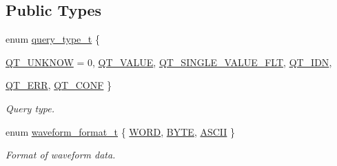\subsection*{Public Types}
\begin{DoxyCompactItemize}
\item 
enum \hyperlink{classmdt_frame_codec_scpi_a2dbce7589140e915f3e253c3523b3b9a}{query\_\-type\_\-t} \{ \par
\hyperlink{classmdt_frame_codec_scpi_a2dbce7589140e915f3e253c3523b3b9aa80aaf6e25ad52710c5f61c6d734a0897}{QT\_\-UNKNOW} =  0, 
\hyperlink{classmdt_frame_codec_scpi_a2dbce7589140e915f3e253c3523b3b9aae429676cb0129c2cb9179baf00d7e082}{QT\_\-VALUE}, 
\hyperlink{classmdt_frame_codec_scpi_a2dbce7589140e915f3e253c3523b3b9aa0f4f3edfd4d8b84dcbbff566de1278df}{QT\_\-SINGLE\_\-VALUE\_\-FLT}, 
\hyperlink{classmdt_frame_codec_scpi_a2dbce7589140e915f3e253c3523b3b9aa889641e5713b59c1d91a9cc607745bc9}{QT\_\-IDN}, 
\par
\hyperlink{classmdt_frame_codec_scpi_a2dbce7589140e915f3e253c3523b3b9aa6e1b9ed9dff72df39e3b3fc88611e4a5}{QT\_\-ERR}, 
\hyperlink{classmdt_frame_codec_scpi_a2dbce7589140e915f3e253c3523b3b9aa3df0e44b2eeacfad6f93ac9201db101d}{QT\_\-CONF}
 \}
\begin{DoxyCompactList}\small\item\em Query type. \end{DoxyCompactList}\item 
enum \hyperlink{classmdt_frame_codec_scpi_a0562eccf33d8cf62e7a73a748a70c475}{waveform\_\-format\_\-t} \{ \hyperlink{classmdt_frame_codec_scpi_a0562eccf33d8cf62e7a73a748a70c475a7f4b47afe74504dea43bb04c8c6fbe58}{WORD}, 
\hyperlink{classmdt_frame_codec_scpi_a0562eccf33d8cf62e7a73a748a70c475aad91226f87cea7fab38f5cc7618f424c}{BYTE}, 
\hyperlink{classmdt_frame_codec_scpi_a0562eccf33d8cf62e7a73a748a70c475a957445cd510a5c4e6964e9b79e73af4d}{ASCII}
 \}
\begin{DoxyCompactList}\small\item\em Format of waveform data. \end{DoxyCompactList}\end{DoxyCompactItemize}
